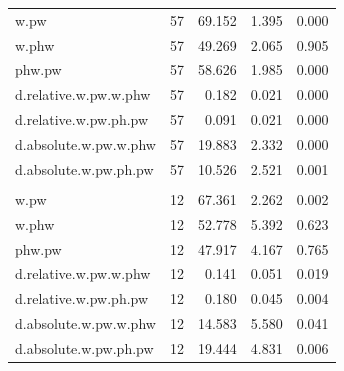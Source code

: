 \documentclass[
]{article}
\begin{document}
\begin{table}
\begin{tabular}[t]{lrrrr}
\hspace{1em}w.pw & 57 & 69.152 & 1.395 & 0.000\\
\hspace{1em}w.phw & 57 & 49.269 & 2.065 & 0.905\\
\hspace{1em}phw.pw & 57 & 58.626 & 1.985 & 0.000\\
\hspace{1em}d.relative.w.pw.w.phw & 57 & 0.182 & 0.021 & 0.000\\
\hspace{1em}d.relative.w.pw.ph.pw & 57 & 0.091 & 0.021 & 0.000\\
\hspace{1em}d.absolute.w.pw.w.phw & 57 & 19.883 & 2.332 & 0.000\\
\hspace{1em}d.absolute.w.pw.ph.pw & 57 & 10.526 & 2.521 & 0.001\\
\addlinespace[0.3em]
\multicolumn{5}{l}{\textbf{students - white.on.black}}\\
\hspace{1em}w.pw & 12 & 67.361 & 2.262 & 0.002\\
\hspace{1em}w.phw & 12 & 52.778 & 5.392 & 0.623\\
\hspace{1em}phw.pw & 12 & 47.917 & 4.167 & 0.765\\
\hspace{1em}d.relative.w.pw.w.phw & 12 & 0.141 & 0.051 & 0.019\\
\hspace{1em}d.relative.w.pw.ph.pw & 12 & 0.180 & 0.045 & 0.004\\
\hspace{1em}d.absolute.w.pw.w.phw & 12 & 14.583 & 5.580 & 0.041\\
\hspace{1em}d.absolute.w.pw.ph.pw & 12 & 19.444 & 4.831 & 0.006\\
\bottomrule
\end{tabular}
\end{table}
\end{document}
